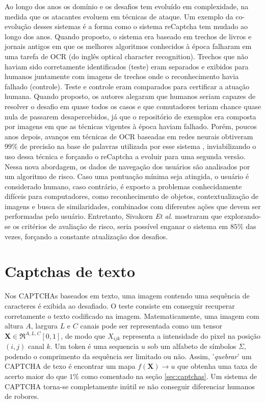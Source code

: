 Ao longo dos anos os domínio e os desafios tem evoluído em complexidade, na medida que os atacantes evoluem em técnicas de ataque. Um exemplo da co-evolução desses sistemas é a forma como o sistema reCaptcha \cite{recaptcha1} tem mudado ao longo dos anos. Quando proposto, o sistema era baseado em trechos de livros e jornais antigos em que os melhores algoritmos conhecidos à época falharam em uma tarefa de OCR (do inglês optical character recognition). Trechos que não haviam sido corretamente identificados (teste) eram separados e exibidos para humanos juntamente com imagens de trechos onde o reconhecimento havia falhado (controle). Teste e controle eram comparados para certificar a atuação humana. Quando proposto, os autores alegaram que humanos seriam capazes de resolver o desafio em quase todos os casos e que comutadores teriam chance quase nula de passarem desapercebidos, já que o repositório de exemplos era composta por imagens em que as técnicas vigentes à época haviam falhado. Porém, poucos anos depois, avanços em técnicas de OCR baseadas em redes neurais obtiveram $99\%$ de precisão na base de palavras utilizada por esse sistema \cite{captcha_break_2013}, inviabilizando o uso dessa técnica e forçando o reCaptcha a evoluir para uma segunda versão. Nessa nova abordagem, os dados de navegação dos usuários são analisados por um algoritmo de risco. Caso uma pontuação mínima seja atingida, o usuário é considerado humano, caso contrário, é exposto a problemas conhecidamente difíceis para computadores, como reconhecimento de objetos, contextualização de imagens e busca de similaridades, combinados com diferentes ações que devem ser performadas pelo usuário. Entretanto, Sivakorn \textit{Et al.} \cite{imarobot} mostraram que explorando-se os critérios de avaliação de risco, seria possível enganar o sistema em $85\%$ das vezes, forçando a constante atualização dos desafios.

\section{Captchas de texto}\label{sec:captchatexto}

Nos CAPTCHAs baseados em texto, uma imagem contendo uma sequência de caracteres é exibida ao desafiado. O teste consiste em conseguir recuperar corretamente o texto codificado na imagem. Matematicamente, uma imagem com altura $A$, largura $L$ e $C$ canais pode ser representada como um tensor $\mathbf{X} \in \Re^{A,L,C}[0,1]$, de modo que  $X_{ijk}$ representa a intensidade do pixel na posição $(i,j)$ canal $k$. Um token é uma sequencia $u$ sob um alfabeto de símbolos $\Sigma$, podendo o comprimento da sequência ser limitado ou não. Assim, '\textit{quebrar}' um CAPTCHA de texo é encontrar um mapa $f(\mathbf{X}) \rightarrow u$ que obtenha uma taxa de acerto maior do que $1\%$ como comentado na seção \ref{sec:captchas}. Um sistema de CAPTCHA torna-se completamente inútil se não conseguir diferenciar humanos de robores.


